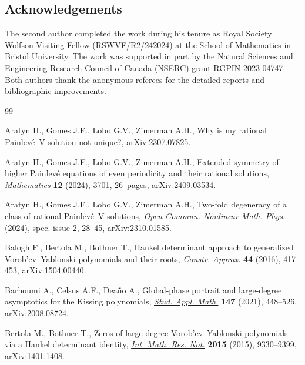 \documentclass[pdftex]{sigma}
\numberwithin{equation}{section}
\theoremstyle{definition}
\begin{document}
\subsection*{Acknowledgements}
The second author completed the work during his tenure as Royal Society Wolfson Visiting
Fellow (RSWVF/R2/242024) at the School of Mathematics in Bristol University. The work was supported in part by the Natural Sciences and Engineering Research Council of Canada (NSERC) grant RGPIN-2023-04747. Both authors thank the anonymous referees for the detailed reports and bibliographic improvements.

\begin{thebibliography}{99}
\footnotesize\itemsep=0pt

Aratyn H., Gomes J.F., Lobo G.V., Zimerman A.H., Why is my rational
 Painlev\'e~V solution not unique?,
 \href{http://arxiv.org/abs/2307.07825}{arXiv:2307.07825}.

Aratyn H., Gomes J.F., Lobo G.V., Zimerman A.H., Extended symmetry of higher
 Painlev\'e equations of even periodicity and their rational solutions,
 \href{https://doi.org/10.3390/math12233701}{\textit{Mathematics}} \textbf{12}
 (2024), 3701, 26~pages,
 \href{http://arxiv.org/abs/2409.03534}{arXiv:2409.03534}.

Aratyn H., Gomes J.F., Lobo G.V., Zimerman A.H., Two-fold degeneracy of a class
 of rational {P}ainlev\'e~{V} solutions,
 \href{https://doi.org/10.46298/ocnmp.13201}{\textit{Open Commun. Nonlinear
 Math. Phys.}} (2024), spec. issue 2, 28--45,
 \href{http://arxiv.org/abs/2310.01585}{arXiv:2310.01585}.

Balogh F., Bertola M., Bothner T., Hankel determinant approach to generalized
 {V}orob'ev--{Y}ablonski polynomials and their roots,
 \href{https://doi.org/10.1007/s00365-016-9328-4}{\textit{Constr. Approx.}}
 \textbf{44} (2016), 417--453,
 \href{http://arxiv.org/abs/1504.00440}{arXiv:1504.00440}.

Barhoumi A., Celsus A.F., Dea\~{n}o A., Global-phase portrait and large-degree
 asymptotics for the {K}issing polynomials,
 \href{https://doi.org/10.1111/sapm.12387}{\textit{Stud. Appl. Math.}}
 \textbf{147} (2021), 448--526,
 \href{http://arxiv.org/abs/2008.08724}{arXiv:2008.08724}.

Bertola M., Bothner T., Zeros of large degree {V}orob'ev--{Y}ablonski
 polynomials via a {H}ankel determinant identity,
 \href{https://doi.org/10.1093/imrn/rnu239}{\textit{Int. Math. Res. Not.}}
 \textbf{2015} (2015), 9330--9399,
 \href{http://arxiv.org/abs/1401.1408}{arXiv:1401.1408}.


\end{thebibliography}
\end{document}
